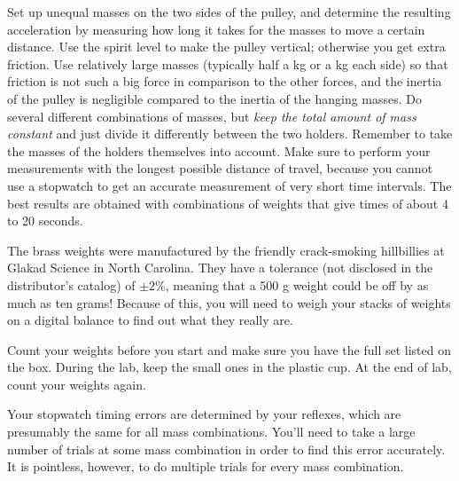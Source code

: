 \label{lab:atwood}

\apparatus
{}


\observations


Set up unequal masses on the two sides of the pulley, and
determine the resulting acceleration by measuring how long
it takes for the masses to move a certain distance. 
Use the spirit level to make the pulley vertical; otherwise you
get extra friction.
Use relatively large
masses (typically half a kg or a kg each side) so that friction
is not such a big force in comparison to the other forces, and
the inertia of the pulley is negligible compared to the inertia
of the hanging masses.
Do several different combinations of masses, but \emph{keep
the total amount of mass constant} and just divide it
differently between the two holders.  Remember to take the
masses of the holders themselves into account. Make sure to
perform your measurements with the longest possible distance
of travel, because you cannot use a stopwatch to get an
accurate measurement of very short time intervals. The best
results are obtained with combinations of weights that give
times of about 4 to 20 seconds.

The brass weights were manufactured by the friendly crack-smoking
hillbillies at Glakad Science in North Carolina. They have a tolerance (not
disclosed in the distributor's catalog) of $\pm 2$\%, meaning
that a 500 g weight could be off by as much as ten grams!
Because of this, you will need to weigh your stacks of weights on
a digital balance to find out what they really are.

Count your weights before you start and make sure you have the full
set listed on the box. During the lab, keep the small ones in the
plastic cup. At the end of lab, count your weights again.

Your stopwatch timing errors are determined by your reflexes, which
are presumably the same for all mass combinations. You'll need to take a large
number of trials at some mass combination in order to find this error accurately.
It is pointless, however, to do multiple trials for every mass combination.

